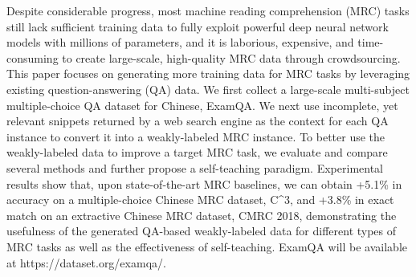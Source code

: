 Despite considerable progress, most machine reading comprehension (MRC) tasks still lack sufficient training data to fully exploit powerful deep neural network models with millions of parameters, and it is laborious, expensive, and time-consuming to create large-scale, high-quality MRC data through crowdsourcing. This paper focuses on generating more training data for MRC tasks by leveraging existing question-answering (QA) data. We first collect a large-scale multi-subject multiple-choice QA dataset for Chinese, ExamQA. We next use incomplete, yet relevant snippets returned by a web search engine as the context for each QA instance to convert it into a weakly-labeled MRC instance. To better use the weakly-labeled data to improve a target MRC task, we evaluate and compare several methods and further propose a self-teaching paradigm. Experimental results show that, upon state-of-the-art MRC baselines, we can obtain +5.1\% in accuracy on a multiple-choice Chinese MRC dataset, C^3, and +3.8\% in exact match on an extractive Chinese MRC dataset, CMRC 2018, demonstrating the usefulness of the generated QA-based weakly-labeled data for different types of MRC tasks as well as the effectiveness of self-teaching. ExamQA will be available at https://dataset.org/examqa/.
